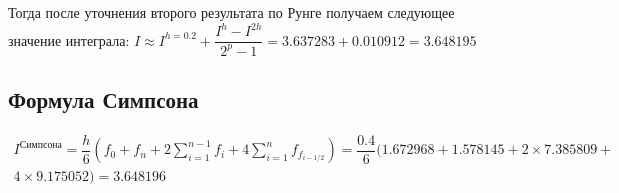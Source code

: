 \documentclass[a4paper,12pt]{report} %
\begin{document}
Тогда после уточнения второго результата по Рунге получаем следующее значение интеграла: $I \approx I^{h=0.2} + \dfrac{I^h - I^{2h}}{2^p - 1} =  3.637283 + 0.010912 =3.648195$

\subsection*{Формула Симпсона}
\begin{multline}
I^{Симпсона} = \dfrac{h}{6} (f_0 + f_n + 2\sum\limits_{i=1}^{n-1}f_i +  4\sum\limits_{i=1}^{n}f_{f_{i-1/2}} ) = \dfrac{0.4}{6} (1.672968 + 1.578145 + 2 \times7.385809 + \\ 4 \times9.175052 ) = 3.648196
\end{multline}
\end{document}
